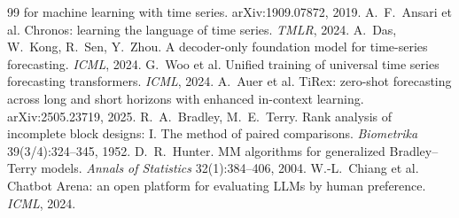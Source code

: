 \documentclass[11pt,a4paper]{article}
\begin{document}
\begin{thebibliography}{99}
for machine learning with time series. arXiv:1909.07872, 2019.
 A.~F.~Ansari et al. Chronos: learning the language of time series. \emph{TMLR}, 2024.
 A.~Das, W.~Kong, R.~Sen, Y.~Zhou. A decoder-only foundation model for time-series forecasting.
\emph{ICML}, 2024.
 G.~Woo et al. Unified training of universal time series forecasting transformers. \emph{ICML}, 2024.
 A.~Auer et al. TiRex: zero-shot forecasting across long and short horizons with enhanced in-context
learning. arXiv:2505.23719, 2025.
 R.~A.~Bradley, M.~E.~Terry. Rank analysis of incomplete block designs: I. The method of paired
comparisons. \emph{Biometrika} 39(3/4):324--345, 1952.
 D.~R.~Hunter. MM algorithms for generalized Bradley--Terry models. \emph{Annals of Statistics}
32(1):384--406, 2004.
 W.-L.~Chiang et al. Chatbot Arena: an open platform for evaluating LLMs by human preference.
\emph{ICML}, 2024.
\end{thebibliography}
\end{document}
